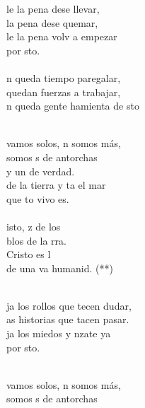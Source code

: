 \begin{cancion}%
	le la pena dese llevar,\\
	 la pena dese quemar,\\
	le la pena volv a empezar \\
	por sto. \\
\jump\\
	n queda tiempo paregalar, \\
	 quedan fuerzas a trabajar,\\
	n queda gente hamienta de sto\\\jump\\
	\begin{chorus}%
	 vamos solos, n somos más,\\
	somos s de antorchas \\
	y un  de verdad.\\
	de la tierra y ta el mar\\
	que to vivo es. \\
\jump\\
	isto, z de los \\
	blos de la rra.\\
	Cristo es l \\
	de una va humanid. (**)\\
	\end{chorus}%
	\jump\\
	ja los rollos que tecen dudar,\\
	as historias que tacen pasar.\\
	ja los miedos y nzate ya  \\
	por sto. \\\jump\\
	\begin{chorus}%
	 vamos solos, n somos más,\\
	somos s de antorchas \\

\end{chorus}
\end{cancion}
